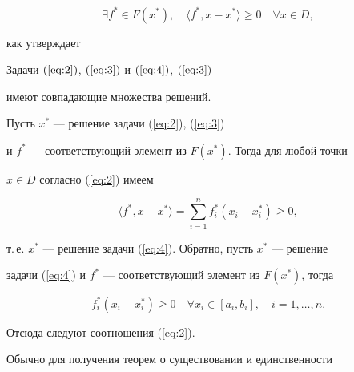 \begin{equation}\label{eq:4}


\exists f^* \in F(x^*),\quad \langle f^{*},x-x^{*} \rangle \ge 0 \quad


\forall x \in D,


\end{equation}


как утверждает











\begin{lems}\label{lem:1a}


Задачи $(\ref{eq:2})$, $(\ref{eq:3})$ и $(\ref{eq:4})$, $(\ref{eq:3})$


имеют совпадающие множества решений.


\end{lems}








\begin{pf}


Пусть $x^*$ --- решение задачи (\ref{eq:2}), (\ref{eq:3})


и $f^*$ --- соответствующий элемент из $F(x^*)$. Тогда для любой точки


$x \in D$ согласно (\ref{eq:2}) имеем


$$


\langle f^{*},x-x^{*} \rangle = \sum\limits^{n}_{i=1}


f^{*}_{i}(x_{i}-x^{*}_{i}) \ge 0,


$$


т.\,е. $x^*$ --- решение задачи (\ref{eq:4}). Обратно, пусть $x^*$ --- решение


задачи (\ref{eq:4}) и $f^*$ --- соответствующий элемент из $F(x^*)$, тогда


$$


f^{*}_{i}(x_{i}-x^{*}_{i}) \ge 0 \quad \forall x_i \in [a_i,b_i], \quad


i=1,\dotsc,n.


$$


Отсюда следуют соотношения (\ref{eq:2}).


\end{pf}





Обычно для получения теорем о существовании и единственности


